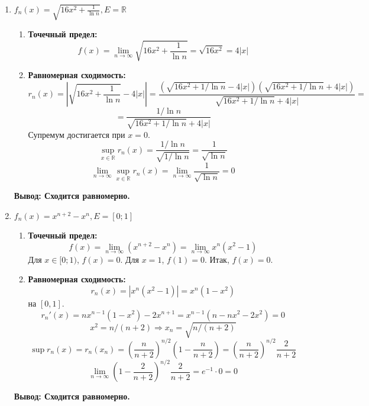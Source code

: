 \documentclass[a4paper, 12pt]{report}
\numberwithin{equation}{section}
\begin{document}
\begin{enumerate}
		\item $f_n(x) = \sqrt{16x^2 + \frac{1}{\ln n}}, E = \mathbb{R}$
		\begin{enumerate}
			\item \textbf{Точечный предел:} $$f(x) = \lim_{n \to \infty} \sqrt{16x^2 + \frac{1}{\ln n}} = \sqrt{16x^2} = 4|x|$$
			\item \textbf{Равномерная сходимость:}
			$$r_n(x) = \left|\sqrt{16x^2 + \frac{1}{\ln n}} - 4|x|\right| = \frac{(\sqrt{16x^2 + 1/\ln n} - 4|x|)(\sqrt{16x^2 + 1/\ln n} + 4|x|)}{\sqrt{16x^2 + 1/\ln n} + 4|x|}=$$
			$$ = \frac{1/\ln n}{\sqrt{16x^2 + 1/\ln n} + 4|x|}$$
			Супремум достигается при $x=0$.
			$$\sup_{x \in \mathbb{R}} r_n(x) = \frac{1/\ln n}{\sqrt{1/\ln n}} = \frac{1}{\sqrt{\ln n}}$$
			$$\lim_{n \to \infty} \sup_{x \in \mathbb{R}} r_n(x) = \lim_{n \to \infty} \frac{1}{\sqrt{\ln n}} = 0$$
		\end{enumerate}
		\textbf{Вывод: Сходится равномерно.}
		
		\item $f_n(x) = x^{n+2} - x^n, E=[0;1]$
		\begin{enumerate}
			\item \textbf{Точечный предел:} $$f(x) = \lim_{n \to \infty} (x^{n+2} - x^n) = \lim_{n \to \infty} x^n(x^2-1)$$
			Для $x \in [0;1)$, $f(x)=0$. Для $x=1$, $f(1)=0$. Итак, $f(x)=0$.
			\item \textbf{Равномерная сходимость:}
			$$r_n(x) = |x^n(x^2-1)| = x^n(1-x^2)$$ на $[0,1]$.
			$$r_n'(x) = nx^{n-1}(1-x^2) - 2x^{n+1} = x^{n-1}(n-nx^2-2x^2) = 0$$
			$$x^2 = n/(n+2) \Rightarrow x_n = \sqrt{n/(n+2)}$$
			$$\sup r_n(x) = r_n(x_n) = \left(\frac{n}{n+2}\right)^{n/2}\left(1-\frac{n}{n+2}\right) = \left(\frac{n}{n+2}\right)^{n/2}\frac{2}{n+2}$$
			$$\lim_{n \to \infty} \left(1-\frac{2}{n+2}\right)^{n/2}\frac{2}{n+2} = e^{-1} \cdot 0 = 0$$
		\end{enumerate}
		\textbf{Вывод: Сходится равномерно.}
		
	\end{enumerate}
	
\end{document}
